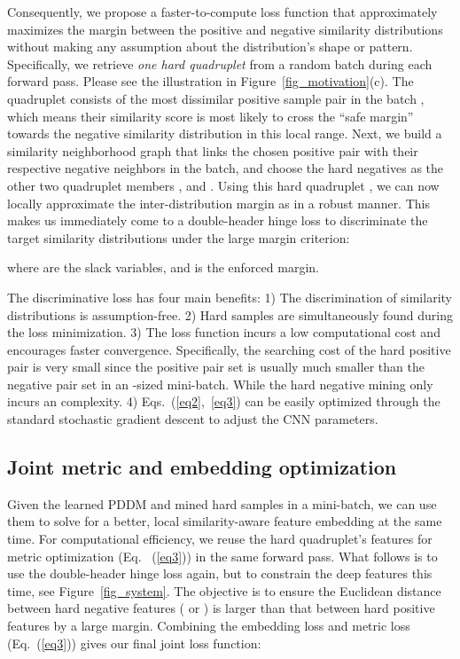 \documentclass{article}
\begin{document}
Consequently, we propose a faster-to-compute loss function that approximately maximizes the margin between the positive and negative similarity distributions without making any assumption about the distribution's shape or pattern. Specifically, we retrieve \emph{one hard quadruplet} from a random batch during each forward pass. Please see the illustration in Figure~\ref{fig_motivation}(c).
The quadruplet consists of the most dissimilar positive sample pair in the batch , which means their similarity score is most likely to cross the ``safe margin'' towards the negative similarity distribution in this local range. Next, we build a similarity neighborhood graph that links the chosen positive pair with their respective negative neighbors in the batch, and choose the hard negatives as the other two quadruplet members , and . Using this hard quadruplet , we can now locally approximate the inter-distribution margin as  in a robust manner. This makes us immediately come to a double-header hinge loss  to discriminate the target similarity distributions under the large margin criterion:

where  are the slack variables, and  is the enforced margin.

The discriminative loss has four main benefits: 1) The discrimination of similarity distributions is assumption-free. 2) Hard samples are simultaneously found during the loss minimization. 3) The loss function incurs a low computational cost and encourages faster convergence. Specifically, the searching cost of the hard positive pair  is very small since the positive pair set  is usually much smaller than the negative pair set  in an -sized mini-batch. While the hard negative mining only incurs an  complexity. 4) Eqs.~(\ref{eq2},~\ref{eq3}) can be easily optimized through the standard stochastic gradient descent to adjust the CNN parameters.

\subsection{Joint metric and embedding optimization}
Given the learned PDDM and mined hard samples in a mini-batch, we can use them to solve for a better, local similarity-aware feature embedding at the same time. For computational efficiency, we reuse the hard quadruplet's features for metric optimization (Eq. ~(\ref{eq3})) in the same forward pass. What follows is to use the double-header hinge loss again, but to constrain the deep features this time, see Figure~\ref{fig_system}. The objective is to ensure the Euclidean distance between hard negative features ( or ) is larger than that between hard positive features  by a large margin. Combining the embedding loss  and metric loss  (Eq.~(\ref{eq3})) gives our final joint loss function:
\end{document}
